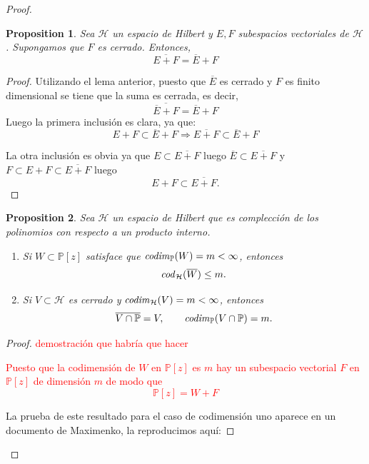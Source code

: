 \documentclass[12pt]{amsart}
\theoremstyle{definition}
\theoremstyle{plain}
\newtheorem{prop}{Proposition}
\theoremstyle{remark}
\begin{document}
\begin{proof}
\begin{prop} Sea $\mathcal{H}$ un espacio de Hilbert y $E,F$ subespacios vectoriales de $\mathcal{H}$. Supongamos que $F$ es cerrado. Entonces, 
$$
\overline{E+F}= \overline{E}+F
$$   
\end{prop}

\begin{proof} Utilizando el lema anterior, puesto que  
$\overline{E}$ es cerrado y $F$ es finito dimensional se tiene que la suma es cerrada, es decir, 
$$
\overline{ \overline{E}+F}= \overline{E} + F
$$
\noindent Luego la primera inclusión es clara, ya que:
$$
E+F \subset \overline{E}+F \Rightarrow \overline{E+F} \subset  \overline{E}+F
$$

\noindent La otra inclusión es obvia ya que $E\subset \overline{E+F}$ luego $\overline{E}\subset \overline{E +F}$ y $F\subset E+F \subset \overline{E+ F}$  luego  
 $$
E+F   \subset \overline{E+F}.    
$$

\end{proof}



\begin{prop} Sea $\mathcal{H}$ un espacio de Hilbert que es complección de los polinomios con respecto a un producto interno. 
\begin{enumerate}
    \item Si $W \subset \mathbb{P}[z]$ satisface que ${\it codim}_{\mathbb{P}}(W)=m <\infty$, entonces 
    $$
    {\it cod}_{\mathcal{H}}(\overline{W}) \leq m. 
    $$
    \item Si $V\subset \mathcal{H}$ es cerrado y ${\it codim}_{\mathcal{H}}(V)=m<\infty$, entonces 
    $$ \overline{V \cap \mathbb{P}}= V, \qquad {\it codim}_{\mathbb{P}}(V \cap \mathbb{P})=m.
    $$
\end{enumerate}
    
\end{prop}




\begin{proof}

\textcolor{red}{demostración que habría que hacer}


\noindent \textcolor{red}{Puesto que la codimensión de $W$ en $\mathbb{P}[z]$ es $m$ hay un subespacio vectorial $F$ en $\mathbb{P}[z]$ de dimensión $m$ de modo que 
$$
\mathbb{P}[z]=W + F
$$
}

\noindent La prueba de este resultado para el caso de codimensión uno aparece en un documento de Maximenko, la reproducimos aquí: 


\end{proof}
\end{proof}
\end{document}
